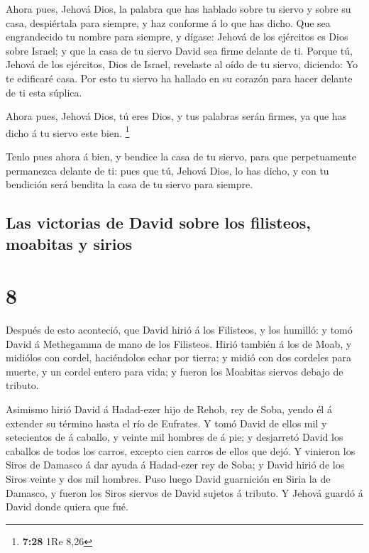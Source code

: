  Ahora pues, Jehová Dios, la palabra que has hablado sobre
tu siervo y sobre su casa, despiértala para siempre, y haz conforme á lo
que has dicho.  Que sea engrandecido tu nombre para
siempre, y dígase: Jehová de los ejércitos es Dios sobre Israel; y que
la casa de tu siervo David sea firme delante de ti.  Porque
tú, Jehová de los ejércitos, Dios de Israel, revelaste al oído de tu
siervo, diciendo: Yo te edificaré casa. Por esto tu siervo ha hallado en
su corazón para hacer delante de ti esta súplica.

 Ahora pues, Jehová Dios, tú eres Dios, y tus palabras
serán firmes, ya que has dicho á tu siervo este bien. \footnote{\textbf{7:28}
  1Re 8,26}

 Tenlo pues ahora á bien, y bendice la casa de tu siervo,
para que perpetuamente permanezca delante de ti: pues que tú, Jehová
Dios, lo has dicho, y con tu bendición será bendita la casa de tu siervo
para siempre.

\hypertarget{las-victorias-de-david-sobre-los-filisteos-moabitas-y-sirios}{%
\subsection{Las victorias de David sobre los filisteos, moabitas y
sirios}\label{las-victorias-de-david-sobre-los-filisteos-moabitas-y-sirios}}

\hypertarget{section-7}{%
\section{8}\label{section-7}}

 Después de esto aconteció, que David hirió á los Filisteos,
y los humilló: y tomó David á Methegamma de mano de los Filisteos.
 Hirió también á los de Moab, y midiólos con cordel,
haciéndolos echar por tierra; y midió con dos cordeles para muerte, y un
cordel entero para vida; y fueron los Moabitas siervos debajo de
tributo.

 Asimismo hirió David á Hadad-ezer hijo de Rehob, rey de
Soba, yendo él á extender su término hasta el río de Eufrates.
 Y tomó David de ellos mil y setecientos de á caballo, y
veinte mil hombres de á pie; y desjarretó David los caballos de todos
los carros, excepto cien carros de ellos que dejó.  Y
vinieron los Siros de Damasco á dar ayuda á Hadad-ezer rey de Soba; y
David hirió de los Siros veinte y dos mil hombres.  Puso
luego David guarnición en Siria la de Damasco, y fueron los Siros
siervos de David sujetos á tributo. Y Jehová guardó á David donde quiera
que fué.

